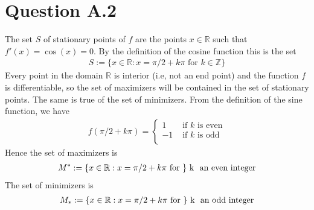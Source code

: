 \documentclass[letterpaper,10pt,english]{jupyterBook}
\begin{document}
\section{Question A.2}
\label{\detokenize{02.exercises_solutions:question-a-2}}
\sphinxAtStartPar
The set \(S\) of stationary points of \(f\) are the points \(x \in \mathbb{R}\) such
that \(f'(x) = \cos(x) = 0\). By the definition of the cosine function this
is the set
\begin{equation*}
\begin{split}
S := \{ x \in \mathbb{R} : x = \pi/2 + k \pi \text{ for } k \in \mathbb{Z} \}
\end{split}
\end{equation*}
\sphinxAtStartPar
Every point in the domain \(\mathbb{R}\) is interior (i.e, not an end point) and
the function \(f\) is differentiable, so the set of maximizers will be
contained in the set of stationary points. The same is true of the set of
minimizers. From the definition of the sine function, we have
\begin{equation*}
\begin{split}
f(\pi/2 + k \pi) =
\begin{cases}
    1 & \text{ if $k$ is even} \\
    -1 & \text{ if $k$ is odd} \\
\end{cases}
\end{split}
\end{equation*}
\sphinxAtStartPar
Hence the set of maximizers is
\begin{equation*}
\begin{split}
M^* := \{ x \in \mathbb{R} : x = \pi/2 + k \pi \text{ for  \} k \text{ an
even integer}}
\end{split}
\end{equation*}
\sphinxAtStartPar
The set of minimizers is
\begin{equation*}
\begin{split}
M_* := \{ x \in \mathbb{R} : x = \pi/2 + k \pi \text{ for  \} k \text{ an
odd integer}}
\end{split}
\end{equation*}
\end{document}
